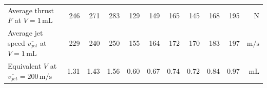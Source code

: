 \begin{landscape}
\begin{table}[]
\begin{tabular}{l|rrr|rrr|rrr|r}
                \hline
                Average thrust $\overline{F}$ at $V=1\,\mathrm{mL}$          & 246            & 271            & 283            & 129            & 149            & 165            & 145            & 168            & 195            & $\mathrm{N}$   \\
                Average jet speed $\overline{v_{jet}}$ at $V=1\,\mathrm{mL}$ & 229            & 240            & 250            & 155            & 164            & 172            & 170            & 183            & 197            & $\mathrm{m/s}$ \\
                Equivalent $V$ at $\overline{v_{jet}}=200\,\mathrm{m/s}$     & 1.31           & 1.43           & 1.56           & 0.60           & 0.67           & 0.74           & 0.72           & 0.84           & 0.97           & $\mathrm{mL}$ \\
                \hline
                \end{tabular}
            \end{table}
        \end{landscape}